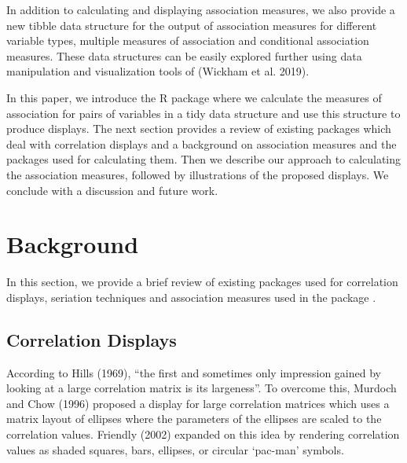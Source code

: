 In addition to calculating and displaying association measures, we also provide a new tibble data structure for the output of association measures for different variable types, multiple measures of association and conditional association measures. These data structures can be easily explored further using data manipulation and visualization tools of  (Wickham et al. 2019).

In this paper, we introduce the R package  where we calculate the measures of association for pairs of variables in a tidy data structure and use this structure to produce displays. The next section provides a review of existing packages which deal with correlation displays and a background on association measures and the packages used for calculating them. Then we describe our approach to calculating the association measures, followed by illustrations of the proposed displays. We conclude with a discussion and future work.

\hypertarget{background}{%
\section{Background}\label{background}}

In this section, we provide a brief review of existing packages used for correlation displays, seriation techniques and association measures used in the package .

\hypertarget{correlation-displays}{%
\subsection{Correlation Displays}\label{correlation-displays}}

According to Hills (1969), ``the first and sometimes only impression gained by looking at a large correlation matrix is its largeness''. To overcome this, Murdoch and Chow (1996) proposed a display for large correlation matrices which uses a matrix layout of ellipses where the parameters of the ellipses are scaled to the correlation values. Friendly (2002) expanded on this idea by rendering correlation values as shaded squares, bars, ellipses, or circular `pac-man' symbols.


